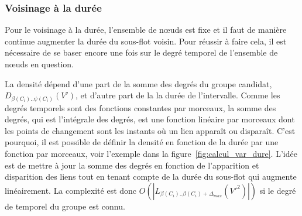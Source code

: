 \subsubsection{Voisinage à la durée}
Pour le voisinage à la durée, l'ensemble de n\oe uds est fixe et il faut de manière continue augmenter la durée du sous-flot voisin.
Pour réussir à faire cela, il est nécessaire de se baser encore une fois sur le degré temporel de l'ensemble de n\oe uds en question.

La densité dépend d'une part de la somme des degrés du groupe candidat, $D_{\beta(C_i)..\psi(C_i)}(V')$, et d'autre part de la la durée de l'intervalle.
Comme les degrés temporels sont des fonctions constantes par morceaux, la somme des degrés, qui est l'intégrale des degrés, est une fonction linéaire par morceaux dont les points de changement sont les instants où un lien apparaît ou disparaît.
C'est pourquoi, il est possible de définir la densité en fonction de la durée par une fonction par morceaux, voir l'exemple dans la figure~\ref{fig:calcul_var_dure}.
L'idée est de mettre à jour la somme des degrés en fonction de l'apparition et disparition des liens tout en tenant compte de la durée du sous-flot qui augmente linéairement.
La complexité est donc $O(|L_{\beta(C_i)..\beta(C_i)+\Delta_{max}}(V'^2)|)$ si le degré de temporel du groupe est connu.

